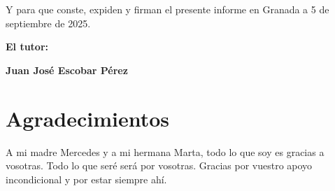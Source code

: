 \vspace{0.5cm}

Y para que conste, expiden y firman el presente informe en Granada a 5 de septiembre de 2025.

\vspace{1cm}

\textbf{El tutor:}

\vspace{5cm}

\noindent \textbf{Juan José Escobar Pérez}

\chapter*{Agradecimientos}
\thispagestyle{empty}

\vspace{1cm}


A mi madre Mercedes y a mi hermana Marta, todo lo que soy es gracias a vosotras. Todo lo que seré será por vosotras. Gracias por vuestro apoyo incondicional y por estar siempre ahí.

